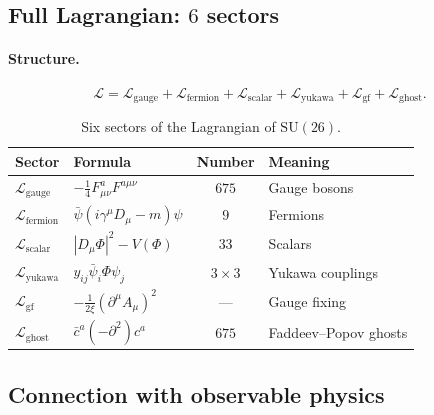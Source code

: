 \documentclass[11pt,a4paper]{article}
\newcommand{\SU}{\mathrm{SU}}
\theoremstyle{definition}
\begin{document}
\subsection{Full Lagrangian: $6$ sectors}
\label{subsec:lagrangian}

\paragraph{Structure.}
\begin{equation}
    \mathcal{L} = \mathcal{L}_{\text{gauge}} 
    + \mathcal{L}_{\text{fermion}} 
    + \mathcal{L}_{\text{scalar}} 
    + \mathcal{L}_{\text{yukawa}} 
    + \mathcal{L}_{\text{gf}} 
    + \mathcal{L}_{\text{ghost}}.
\end{equation}

\begin{table}[htbp]
\centering
\caption{Six sectors of the Lagrangian of $\SU(26)$.}
\label{tab:lagrangian-sectors}
\begin{tabular}{llcl}
\toprule
Sector & Formula & Number & Meaning \\ 
\midrule
$\mathcal{L}_{\text{gauge}}$ & $-\tfrac14 F_{\mu\nu}^a F^{a\mu\nu}$ 
    & $675$ & Gauge bosons \\[0.3em]
$\mathcal{L}_{\text{fermion}}$ & $\bar\psi(i\gamma^\mu D_\mu - m)\psi$ 
    & $9$ & Fermions \\[0.3em]
$\mathcal{L}_{\text{scalar}}$ & $|D_\mu \Phi|^2 - V(\Phi)$ 
    & $33$ & Scalars \\[0.3em]
$\mathcal{L}_{\text{yukawa}}$ & $y_{ij} \bar\psi_i \Phi \psi_j$ 
    & $3 \times 3$ & Yukawa couplings \\[0.3em]
$\mathcal{L}_{\text{gf}}$ & $-\tfrac{1}{2\xi}(\partial^\mu A_\mu)^2$ 
    & --- & Gauge fixing \\[0.3em]
$\mathcal{L}_{\text{ghost}}$ & $\bar c^a (-\partial^2) c^a$ 
    & $675$ & Faddeev--Popov ghosts \\ 
\bottomrule
\end{tabular}
\end{table}

\subsection{Connection with observable physics}
\label{subsec:observed-physics}
\end{document}
